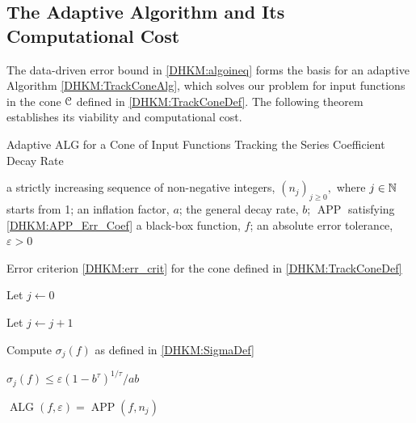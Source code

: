 \documentclass[USenglish]{article}
\theoremstyle{dgthm}
\theoremstyle{dgthm}
\theoremstyle{dgthm}
\theoremstyle{dgthm}
\theoremstyle{dgdef}
\theoremstyle{definition}
\DeclareMathOperator{\APP}{APP}
\DeclareMathOperator{\ALG}{ALG}
\begin{document}
\subsection{The Adaptive Algorithm and Its
 Computational Cost}

The data-driven error bound in \eqref{DHKM:algoineq} forms the basis for an adaptive Algorithm \ref{DHKM:TrackConeAlg}, which solves our problem for input functions in the cone ${\mathcal{C}}$ defined in \eqref{DHKM:TrackConeDef}.  The following theorem establishes its viability and computational cost.

\begin{algorithm}
	\caption{Adaptive ALG for a Cone of Input Functions Tracking the Series Coefficient Decay Rate \label{DHKM:TrackConeAlg}}
	\begin{algorithmic}
	\PARAM a strictly increasing sequence of non-negative integers, $(n_j)_{j\ge 0},$ where $j \in {\mathbb{N}}$ starts from 1; an inflation factor, $a$; the general decay rate, $b$; $\APP$ satisfying \eqref{DHKM:APP_Err_Coef}
		\INPUT a black-box function, $f$; an absolute error tolerance,
		$\varepsilon>0$

\Ensure Error criterion \eqref{DHKM:err_crit} for  the cone defined in \eqref{DHKM:TrackConeDef}

\State Let $j \leftarrow 0$
\Repeat

\State Let $j \leftarrow j + 1$

\State Compute $\sigma_{j}(f)$ as defined in \eqref{DHKM:SigmaDef}

\Until $\sigma_{j}(f) \le \varepsilon (1 - b^\tau)^{1/\tau}/ab$

\RETURN $\ALG(f,\varepsilon) = \APP(f,n_{j})$
\end{algorithmic}
\end{algorithm}
\end{document}
